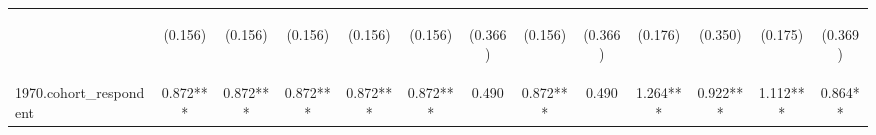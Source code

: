 \begin{center}
\begin{tabular}{lcccccccccccc}
\vspace{4pt} & \begin{footnotesize}(0.156)\end{footnotesize} & \begin{footnotesize}(0.156)\end{footnotesize} & \begin{footnotesize}(0.156)\end{footnotesize} & \begin{footnotesize}(0.156)\end{footnotesize} & \begin{footnotesize}(0.156)\end{footnotesize} & \begin{footnotesize}(0.366)\end{footnotesize} & \begin{footnotesize}(0.156)\end{footnotesize} & \begin{footnotesize}(0.366)\end{footnotesize} & \begin{footnotesize}(0.176)\end{footnotesize} & \begin{footnotesize}(0.350)\end{footnotesize} & \begin{footnotesize}(0.175)\end{footnotesize} & \begin{footnotesize}(0.369)\end{footnotesize} \\
1970.cohort\_respondent & 0.872*** & 0.872*** & 0.872*** & 0.872*** & 0.872*** & 0.490 & 0.872*** & 0.490 & 1.264*** & 0.922*** & 1.112*** & 0.864** \\

\end{tabular}
\end{center}
